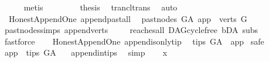 \begin{isabellebody}
\ \ \ \ \isamarkupfalse%
\ {\isacharparenleft}{\kern0pt}metis{\isacharparenright}{\kern0pt}\ \isanewline
\ \ \ \ \isamarkupfalse%
\ \isamarkupfalse%
\ {\isacharquery}{\kern0pt}thesis\ \isamarkupfalse%
\ trancl{\isacharunderscore}{\kern0pt}trans\ \isamarkupfalse%
\ auto\ \isanewline
\ \ \isamarkupfalse%
\isanewline
{}\isamarkupfalse%
%
\endisatagproof
{\isafoldproof}%
%
\isadelimproof
\isanewline
%
\endisadelimproof
\isanewline
{}\isamarkupfalse%
\ {\isacharparenleft}{\kern0pt}\ Honest{\isacharunderscore}{\kern0pt}Append{\isacharunderscore}{\kern0pt}One{\isacharparenright}{\kern0pt}\ append{\isacharunderscore}{\kern0pt}past{\isacharunderscore}{\kern0pt}all{\isacharcolon}{\kern0pt}\isanewline
\ \ {\isachardoublequoteopen}past{\isacharunderscore}{\kern0pt}nodes\ G{\isacharunderscore}{\kern0pt}A\ app\ {\isacharequal}{\kern0pt}\ verts\ G{\isachardoublequoteclose}\isanewline
%
\isadelimproof
\ \ %
\endisadelimproof
%
\isatagproof
{}\isamarkupfalse%
\ past{\isacharunderscore}{\kern0pt}nodes{\isachardot}{\kern0pt}simps\ append{\isacharunderscore}{\kern0pt}verts\ \isanewline
\ \ \isamarkupfalse%
\ reaches{\isacharunderscore}{\kern0pt}all\ DAG{\isachardot}{\kern0pt}cycle{\isacharunderscore}{\kern0pt}free\ bD{\isacharunderscore}{\kern0pt}A\ subs\isanewline
\ \ \isamarkupfalse%
\ fastforce%
\endisatagproof
{\isafoldproof}%
%
\isadelimproof
\ \isanewline
%
\endisadelimproof
\isanewline
{}\isamarkupfalse%
\ {\isacharparenleft}{\kern0pt}\ Honest{\isacharunderscore}{\kern0pt}Append{\isacharunderscore}{\kern0pt}One{\isacharparenright}{\kern0pt}\ append{\isacharunderscore}{\kern0pt}is{\isacharunderscore}{\kern0pt}only{\isacharunderscore}{\kern0pt}tip{\isacharcolon}{\kern0pt}\isanewline
\ \ {\isachardoublequoteopen}tips\ G{\isacharunderscore}{\kern0pt}A\ {\isacharequal}{\kern0pt}\ {\isacharbraceleft}{\kern0pt}app{\isacharbraceright}{\kern0pt}{\isachardoublequoteclose}\isanewline
%
\isadelimproof
%
\endisadelimproof
%
\isatagproof
{}\isamarkupfalse%
\ safe\isanewline
\ \ \isamarkupfalse%
\ {\isachardoublequoteopen}app\ {\isasymin}\ tips\ G{\isacharunderscore}{\kern0pt}A\ {\isachardoublequoteclose}\ \isamarkupfalse%
\ append{\isacharunderscore}{\kern0pt}in{\isacharunderscore}{\kern0pt}tips\ \isamarkupfalse%
\ simp\isanewline
\ \ \isamarkupfalse%
\ x\ \isanewline
\ \ \isamarkupfalse%

\end{isabellebody}
